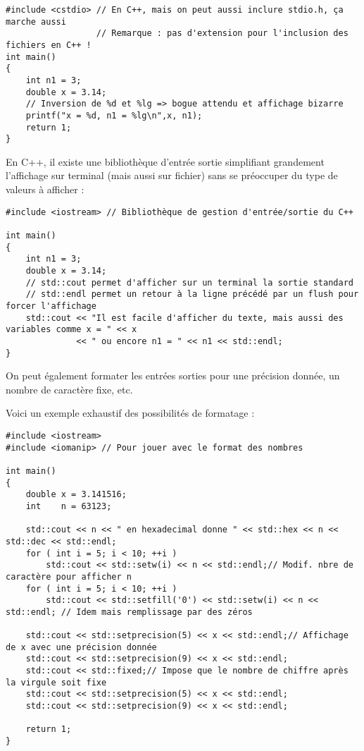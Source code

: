 \begin{lstlisting}
#include <cstdio> // En C++, mais on peut aussi inclure stdio.h, ça marche aussi
                  // Remarque : pas d'extension pour l'inclusion des fichiers en C++ !
int main()
{
    int n1 = 3;
    double x = 3.14;
    // Inversion de %d et %lg => bogue attendu et affichage bizarre
    printf("x = %d, n1 = %lg\n",x, n1);
    return 1;
}
\end{lstlisting}

En C++, il existe une bibliothèque d'entrée sortie simplifiant grandement l'affichage sur terminal (mais aussi sur fichier) sans se préoccuper du type de valeurs à afficher :

\begin{lstlisting}
#include <iostream> // Bibliothèque de gestion d'entrée/sortie du C++

int main()
{
    int n1 = 3;
    double x = 3.14;
    // std::cout permet d'afficher sur un terminal la sortie standard
    // std::endl permet un retour à la ligne précédé par un flush pour forcer l'affichage
    std::cout << "Il est facile d'afficher du texte, mais aussi des variables comme x = " << x
              << " ou encore n1 = " << n1 << std::endl;
}
\end{lstlisting}

On peut également formater les entrées sorties pour une précision donnée, un nombre de caractère fixe, etc.

Voici un exemple exhaustif des possibilités de formatage :
\begin{lstlisting}
#include <iostream>
#include <iomanip> // Pour jouer avec le format des nombres

int main()
{
    double x = 3.141516;
    int    n = 63123;

    std::cout << n << " en hexadecimal donne " << std::hex << n << std::dec << std::endl;
    for ( int i = 5; i < 10; ++i )
        std::cout << std::setw(i) << n << std::endl;// Modif. nbre de caractère pour afficher n
    for ( int i = 5; i < 10; ++i )
        std::cout << std::setfill('0') << std::setw(i) << n << std::endl; // Idem mais remplissage par des zéros

    std::cout << std::setprecision(5) << x << std::endl;// Affichage de x avec une précision donnée
    std::cout << std::setprecision(9) << x << std::endl;
    std::cout << std::fixed;// Impose que le nombre de chiffre après la virgule soit fixe
    std::cout << std::setprecision(5) << x << std::endl;
    std::cout << std::setprecision(9) << x << std::endl;

    return 1;
}
\end{lstlisting}

